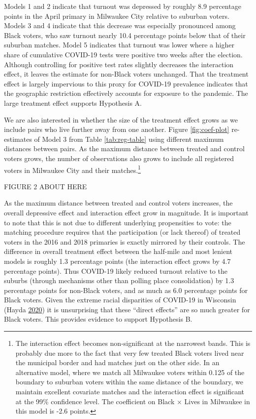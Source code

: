 \documentclass[
  12pt,
]{article}
\begin{document}
Models 1 and 2 indicate that turnout was depressed by roughly 8.9 percentage points in the April primary in Milwaukee City relative to suburban voters. Models 3 and 4 indicate that this decrease was especially pronounced among Black voters, who saw turnout nearly 10.4 percentage points below that of their suburban matches. Model 5 indicates that turnout was lower where a higher share of cumulative COVID-19 tests were positive two weeks after the election. Although controlling for positive test rates slightly decreases the interaction effect, it leaves the estimate for non-Black voters unchanged. That the treatment effect is largely impervious to this proxy for COVID-19 prevalence indicates that the geographic restriction effectively accounts for exposure to the pandemic. The large treatment effect supports Hypothesis A.

We are also interested in whether the size of the treatment effect grows as we include pairs who live further away from one another. Figure \ref{fig:coef-plot} re-estimates of Model 3 from Table \ref{tab:reg-table} using different maximum distances between pairs. As the maximum distance between treated and control voters grows, the number of observations also grows to include all registered voters in Milwaukee City and their matches.\footnote{The interaction effect becomes non-significant at the narrowest bands. This is probably due more to the fact that very few treated Black voters lived near the municipal border and had matches just on the other side. In an alternative model, where we match all Milwaukee voters within 0.125 of the boundary to suburban voters within the same distance of the boundary, we maintain excellent covariate matches and the interaction effect is significant at the 99\% confidence level. The coefficient on Black × Lives in Milwaukee in this model is -2.6 points.}

FIGURE 2 ABOUT HERE

As the maximum distance between treated and control voters increases, the overall depressive effect and interaction effect grow in magnitude. It is important to note that this is not due to different underlying propensities to vote: the matching procedure requires that the participation (or lack thereof) of treated voters in the 2016 and 2018 primaries is exactly mirrored by their controls. The difference in overall treatment effect between the half-mile and most lenient models is roughly 1.3 percentage points (the interaction effect grows by 4.7 percentage points). Thus COVID-19 likely reduced turnout relative to the suburbs (through mechanisms other than polling place consolidation) by 1.3 percentage points for non-Black voters, and as much as 6.0 percentage points for Black voters. Given the extreme racial disparities of COVID-19 in Wisconsin (Hayda \protect\hyperlink{ref-Hayda2020}{2020}) it is unsurprising that these ``direct effects'' are so much greater for Black voters. This provides evidence to support Hypothesis B.
\end{document}
